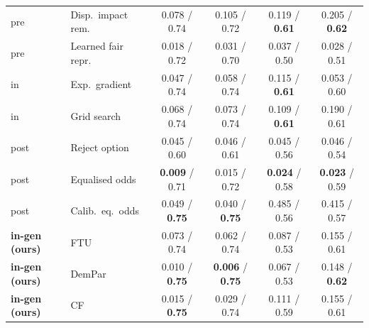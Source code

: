 \begin{table}[t]
\begin{tabular}{llcccc}
pre  & Disp.\ impact rem. & 0.078 / 0.74 & 0.105 / 0.72 & 0.119 / \textbf{0.61} & 0.205 / \textbf{0.62} \\
pre  & Learned fair repr. & 0.018 / 0.72 & 0.031 / 0.70 & 0.037 / 0.50 & 0.028 / 0.51 \\
\addlinespace[2pt]
in   & Exp.\ gradient     & 0.047 / 0.74 & 0.058 / 0.74 & 0.115 / \textbf{0.61} & 0.053 / 0.60 \\
in   & Grid search        & 0.068 / 0.74 & 0.073 / 0.74 & 0.109 / \textbf{0.61} & 0.190 / 0.61 \\
\addlinespace[2pt]
post & Reject option      & 0.045 / 0.60 & 0.046 / 0.61 & 0.045 / 0.56 & 0.046 / 0.54 \\
post & Equalised odds     & \textbf{0.009} / 0.71 & 0.015 / 0.72 & \textbf{0.024} / 0.58 & \textbf{0.023} / 0.59 \\
post & Calib.\ eq.\ odds  & 0.049 / \textbf{0.75} & 0.040 / \textbf{0.75} & 0.485 / 0.56 & 0.415 / 0.57 \\
\addlinespace[2pt]
\textbf{in-gen (ours)} & FTU    & 0.073 / 0.74 & 0.062 / 0.74 & 0.087 / 0.53 & 0.155 / 0.61 \\
\textbf{in-gen (ours)} & DemPar & 0.010 / \textbf{0.75} & \textbf{0.006} / \textbf{0.75} & 0.067 / 0.53 & 0.148 / \textbf{0.62} \\
\textbf{in-gen (ours)} & CF     & 0.015 / \textbf{0.75} & 0.029 / 0.74 & 0.111 / 0.59 & 0.155 / 0.61 \\
\bottomrule
\end{tabular}
\end{table}
